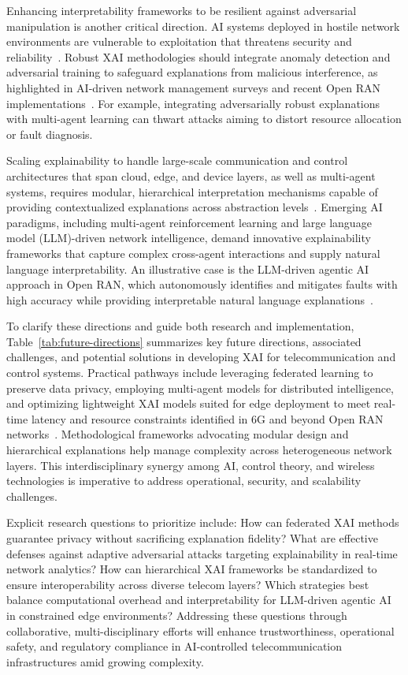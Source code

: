\documentclass[sigconf]{acmart}
\begin{document}
Enhancing interpretability frameworks to be resilient against adversarial manipulation is another critical direction. AI systems deployed in hostile network environments are vulnerable to exploitation that threatens security and reliability~\cite{ref50}. Robust XAI methodologies should integrate anomaly detection and adversarial training to safeguard explanations from malicious interference, as highlighted in AI-driven network management surveys and recent Open RAN implementations~\cite{ref54}. For example, integrating adversarially robust explanations with multi-agent learning can thwart attacks aiming to distort resource allocation or fault diagnosis.

Scaling explainability to handle large-scale communication and control architectures that span cloud, edge, and device layers, as well as multi-agent systems, requires modular, hierarchical interpretation mechanisms capable of providing contextualized explanations across abstraction levels~\cite{ref55}. Emerging AI paradigms, including multi-agent reinforcement learning and large language model (LLM)-driven network intelligence, demand innovative explainability frameworks that capture complex cross-agent interactions and supply natural language interpretability. An illustrative case is the LLM-driven agentic AI approach in Open RAN, which autonomously identifies and mitigates faults with high accuracy while providing interpretable natural language explanations~\cite{ref55}.

To clarify these directions and guide both research and implementation, Table~\ref{tab:future-directions} summarizes key future directions, associated challenges, and potential solutions in developing XAI for telecommunication and control systems. Practical pathways include leveraging federated learning to preserve data privacy, employing multi-agent models for distributed intelligence, and optimizing lightweight XAI models suited for edge deployment to meet real-time latency and resource constraints identified in 6G and beyond Open RAN networks~\cite{ref54}. Methodological frameworks advocating modular design and hierarchical explanations help manage complexity across heterogeneous network layers. This interdisciplinary synergy among AI, control theory, and wireless technologies is imperative to address operational, security, and scalability challenges.

Explicit research questions to prioritize include: How can federated XAI methods guarantee privacy without sacrificing explanation fidelity? What are effective defenses against adaptive adversarial attacks targeting explainability in real-time network analytics? How can hierarchical XAI frameworks be standardized to ensure interoperability across diverse telecom layers? Which strategies best balance computational overhead and interpretability for LLM-driven agentic AI in constrained edge environments? Addressing these questions through collaborative, multi-disciplinary efforts will enhance trustworthiness, operational safety, and regulatory compliance in AI-controlled telecommunication infrastructures amid growing complexity.
\end{document}
